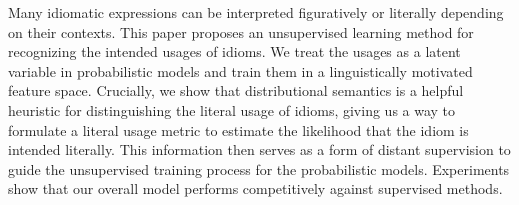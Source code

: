 Many idiomatic expressions can be interpreted figuratively or literally depending on their contexts. This paper proposes an unsupervised learning method for recognizing the intended usages of idioms. We treat the usages as a latent variable in probabilistic models and train them in a linguistically motivated feature space. Crucially, we show that distributional semantics is a helpful heuristic for distinguishing the literal usage of idioms, giving us a way to formulate a literal usage metric to estimate the likelihood that the idiom is intended literally. This information then serves as a form of distant supervision to guide the unsupervised training process for the probabilistic models. Experiments show that our overall model performs competitively against supervised methods.
